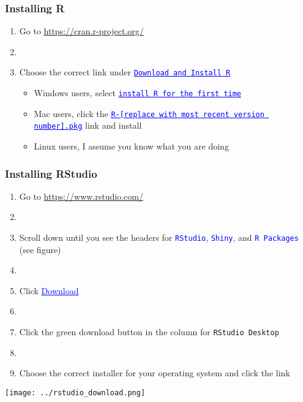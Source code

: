 \documentclass[11pt]{beamer}
\newcommand{\myframe}[1]{\begin{frame} \frametitle{#1}}
\newenvironment{spaceitemize}
{ \begin{itemize}
    \setlength{\itemsep}{10pt}
    \setlength{\parskip}{0pt}
    \setlength{\parsep}{0pt}     }
{ \end{itemize}                  }
\begin{document}
\myframe{Installing R}
\begin{enumerate}
\item Go to \url{https://cran.r-project.org/}
\item[]
\item Choose the correct link under \textcolor{blue}{\underline{\texttt{Download and Install R}}}
\begin{spaceitemize}
\item Windows users, select \textcolor{blue}{\underline{\texttt{install R for the first time}}}
\item Mac users, click the \textcolor{blue}{\underline{\texttt{R-[replace with most recent version number].pkg}}} link and install
\item Linux users, I assume you know what you are doing
\end{spaceitemize}
\end{enumerate}

\end{frame}

\myframe{Installing RStudio}
\begin{enumerate}
\item Go to \url{https://www.rstudio.com/}
\item[]
\item Scroll down until you see the headers for \textcolor{blue}{\texttt{RStudio}}, \textcolor{blue}{\texttt{Shiny}}, and \textcolor{blue}{\texttt{R Packages}}  (see figure)
\item[]
\item Click \textcolor{blue}{\underline{Download}}
\item[] 
\item Click the green download button in the column for \texttt{RStudio Desktop}
\item[]
\item Choose the correct installer for your operating system and click the link
\end{enumerate}
\centering
\texttt{[image: ../rstudio\_download.png]}
\end{frame}
\end{document}
